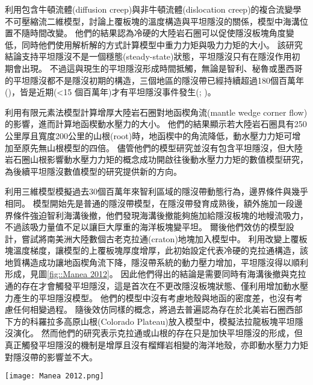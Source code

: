 \citealp{Thermal2012}利用包含牛頓流體(diffusion creep)與非牛頓流體(dislocation creep)的複合流變學不可壓縮流二維模型，討論上覆板塊的溫度構造與平坦隱沒的關係，模型中海溝位置不隨時間改變。
他們的結果認為冷硬的大陸岩石圈可以促使隱沒板塊角度變低，同時他們使用解析解的方式計算模型中重力力矩與吸力力矩的大小。
該研究結論支持平坦隱沒不是一個穩態(steady-state)狀態，平坦隱沒只有在隱沒作用初期會出現。
不過這與現生的平坦隱沒形成時間抵觸，無論是智利、秘魯或墨西哥的平坦隱沒都不是隱沒初期的構造，三個地區的隱沒帶已經持續超過180個百萬年(\citealp{Schellart2021})，皆是近期(<15 個百萬年)才有平坦隱沒事件發生(\citealp{chen2019southward}; \citealp{hu2021southward})。

\citealp{o2009subduction}利用有限元素法模型計算增厚大陸岩石圈對地函楔角流(mantle wedge corner flow)的影響，進而計算地函楔動水壓力的大小。
他們的結果顯示若大陸岩石圈具有250公里厚且寬度200公里的山根(root)時，地函楔中的角流降低，動水壓力力矩可增加至原先無山根模型的四倍。
儘管他們的模型研究並沒有包含平坦隱沒，但大陸岩石圈山根影響動水壓力力矩的概念成功開啟往後動水壓力力矩的數值模型研究，為後續平坦隱沒數值模型的研究提供新的方向。

\citealp{Manea2012Chile}利用三維模型模擬過去30個百萬年來智利區域的隱沒帶動態行為，邊界條件與\citealp{Thermal2012}幾乎相同。
模型開始先是普通的隱沒帶模型，在隱沒帶發育成熟後，額外施加一段邊界條件強迫智利海溝後撤，他們發現海溝後撤能夠施加給隱沒板塊的地幔流吸力，不過該吸力量值不足以讓巨大厚重的海洋板塊變平坦。
爾後他們效仿\citealp{o2009subduction}的模型設計，嘗試將南美洲大陸數個古老克拉通(craton)地塊加入模型中。
利用改變上覆板塊溫度梯度，讓模型的上覆板塊厚度增厚，此初始設定代表冷硬的克拉通構造，該地質構造成功讓地函楔角流下降，隱沒帶系統的動力壓力增加，平坦隱沒得以順利形成，見圖\ref{fig::Manea 2012}。
因此他們得出的結論是需要同時有海溝後撤與克拉通的存在才會觸發平坦隱沒，這是首次在不更改隱沒板塊狀態、僅利用增加動水壓力產生的平坦隱沒模型。
他們的模型中沒有考慮地殼與地函的密度差，也沒有考慮任何相變過程。
隨後\citealp{Liu2016}效仿同樣的概念，將過去普遍認為存在於北美岩石圈西部下方的科羅拉多高原山根(Colorado Plateau)放入模型中，模擬法拉龍板塊平坦隱沒演化。
然而他們的研究表示克拉通或山根的存在只是加快平坦隱沒的形成，但真正觸發平坦隱沒的機制是增厚且沒有榴輝岩相變的海洋地殼，亦即動水壓力力矩對隱沒帶的影響並不大。
\begin{figure*}[ht!]
    \centering
    \texttt{[image: Manea 2012.png]}
    \caption[\citealp{Manea2012Chile}中的智利平坦隱沒模型]{\citealp{Manea2012Chile}中的智利平坦隱沒模型，模型中同時加入海溝後撤邊界條件與增厚大陸岩石圈可以讓平坦隱沒發育。
    }
    \label{fig::Manea 2012}
\end{figure*}

